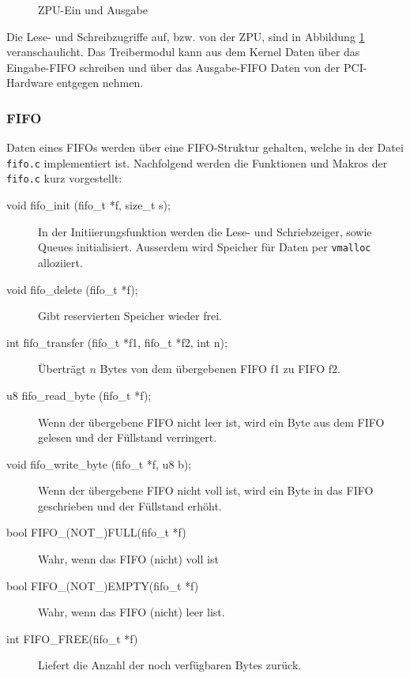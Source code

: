 \documentclass[11pt]{scrartcl}
\begin{document}
\begin{figure}
	\begin{center}
		
		\caption{ZPU-Ein und Ausgabe}
		\label{zpu_io}
	\end{center}
\end{figure}

Die Lese- und Schreibzugriffe auf, bzw. von der ZPU, sind in Abbildung \ref{zpu_io} veranschaulicht. Das Treibermodul kann aus dem Kernel Daten über das Eingabe-FIFO schreiben und über das Ausgabe-FIFO Daten von der PCI-Hardware entgegen nehmen.

\subsubsection{FIFO}

Daten eines FIFOs werden über eine FIFO-Struktur gehalten, welche in der Datei \texttt{fifo.c} implementiert ist. Nachfolgend werden die Funktionen und Makros der \texttt{fifo.c} kurz vorgestellt:

\begin{description}
    \item[void fifo\_init       (fifo\_t *f, size\_t s);]
    In der Initiierungsfunktion werden die Lese- und Schriebzeiger, sowie Queues initialisiert. Ausserdem wird Speicher für Daten per \texttt{vmalloc} alloziiert. 
    
    \item[void fifo\_delete     (fifo\_t *f);]
    Gibt reservierten Speicher wieder frei. 
    
    \item[int  fifo\_transfer   (fifo\_t *f1, fifo\_t *f2, int n);]
    Überträgt $n$ Bytes von dem übergebenen FIFO f1 zu FIFO f2.
    
    \item[u8   fifo\_read\_byte  (fifo\_t *f);]
    Wenn der übergebene FIFO nicht leer ist, wird ein Byte aus dem FIFO gelesen und der Füllstand verringert. 
    
    \item[void fifo\_write\_byte (fifo\_t *f, u8 b);]
    Wenn der übergebene FIFO nicht voll ist, wird ein Byte in das FIFO geschrieben und der Füllstand erhöht.
    \item [bool FIFO\_(NOT\_)FULL(fifo\_t *f)] Wahr, wenn das FIFO (nicht) voll ist
    \item [bool FIFO\_(NOT\_)EMPTY(fifo\_t *f)] Wahr, wenn das FIFO (nicht) leer list.
    \item [int FIFO\_FREE(fifo\_t *f)] Liefert die Anzahl der noch verfügbaren Bytes zurück.
\end{description}
\end{document}
